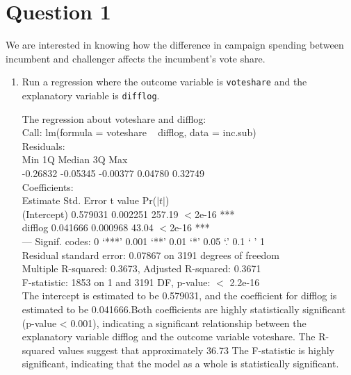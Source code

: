 \documentclass[12pt,letterpaper]{article}
\begin{document}
\section*{Question 1}
\vspace{.25cm}
\noindent We are interested in knowing how the difference in campaign spending between incumbent and challenger affects the incumbent's vote share. 
	\begin{enumerate}
		\item Run a regression where the outcome variable is \texttt{voteshare} and the explanatory variable is \texttt{difflog}.\\
		
		\vspace{.15cm}
		 
		\vspace{.15cm}
		
		\noindent The regression about voteshare and difflog:\\
		Call:
		lm(formula = voteshare ~ difflog, data = inc.sub)\\
		\vspace{.15cm}
		Residuals:\\
		Min       1Q   Median       3Q      Max\\ 
		-0.26832 -0.05345 -0.00377  0.04780  0.32749 \\
		\vspace{.15cm}
		Coefficients:\\
		Estimate Std. Error t value Pr($\left| t \right|$)  \\  
		(Intercept) 0.579031   0.002251  257.19   $<$2e-16 ***\\
		difflog     0.041666   0.000968   43.04   $<$2e-16 ***\\
		---
		Signif. codes:  0 ‘***’ 0.001 ‘**’ 0.01 ‘*’ 0.05 ‘.’ 0.1 ‘ ’ 1\\
		\vspace{.15cm}
		Residual standard error: 0.07867 on 3191 degrees of freedom\\
		Multiple R-squared:  0.3673,	Adjusted R-squared:  0.3671 \\
		F-statistic:  1853 on 1 and 3191 DF,  p-value: $<$ 2.2e-16\\
		
		\noindent The intercept is estimated to be 0.579031, and the coefficient for difflog is estimated to be 0.041666.Both coefficients are highly statistically significant (p-value < 0.001), indicating a significant relationship between the explanatory variable difflog and the outcome variable voteshare.
		The R-squared values suggest that approximately 36.73%
		The F-statistic is highly significant, indicating that the model as a whole is statistically significant.
		

\end{enumerate}
\end{document}
